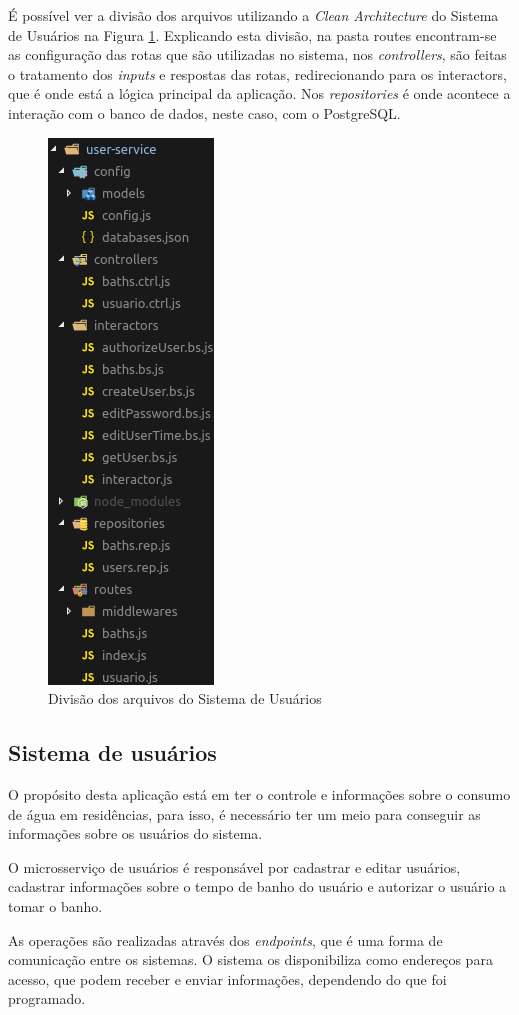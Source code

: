 É possível ver a divisão dos arquivos utilizando a \textit{Clean Architecture} do Sistema de Usuários na Figura \ref{fig:clean}. Explicando esta divisão, na pasta routes encontram-se as configuração das rotas que são utilizadas no sistema, nos \textit{controllers}, são feitas o tratamento dos \textit{inputs} e respostas das rotas, redirecionando para os interactors, que é onde está a lógica principal da aplicação. Nos \textit{repositories} é onde acontece a interação com o banco de dados, neste caso, com o PostgreSQL.

\begin{figure}[htbp]
	\centering
	\includegraphics[width=0.22\linewidth]{figuras/cleanarch.png}
	\caption{Divisão dos arquivos do Sistema de Usuários}
	\label{fig:clean}
\end{figure}



\subsection{Sistema de usuários} \label{sec:usuarios}

O propósito desta aplicação está em ter o controle e informações sobre o consumo de água em residências, para isso, é necessário ter um meio para conseguir as informações sobre os usuários do sistema. 

O microsserviço de usuários é responsável por cadastrar e editar usuários, cadastrar informações sobre o tempo de banho do usuário e autorizar o usuário a tomar o banho.

As operações são realizadas através dos \textit{endpoints}, que é uma forma de comunicação entre os sistemas. O sistema os disponibiliza como endereços para acesso, que podem receber e enviar informações, dependendo do que foi programado.


